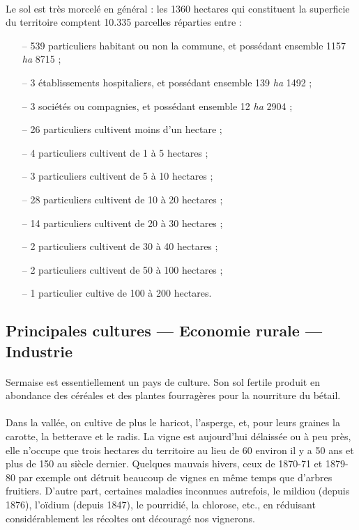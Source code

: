 \documentclass[../eBook.tex]{subfiles}
\begin{document}
    \paragraph{}Le sol est très morcelé en général : les 1360 hectares qui constituent la superficie du territoire comptent 10.335 parcelles réparties entre :
    \begin{itemize}[noitemsep]
      \setlength{\baselineskip}{16pt}
      \item[--] 539 particuliers habitant ou non la commune, et possédant ensemble 1157 \textit{ha} 8715 ;
      \item[--] 3 établissements hospitaliers, et possédant ensemble 139 \textit{ha} 1492 ;
      \item[--] 3 sociétés ou compagnies, et possédant ensemble 12 \textit{ha} 2904 ;
      \item[--] 26 particuliers cultivent moins d'un hectare ;
      \item[--] 4 particuliers cultivent de 1 à 5 hectares ;
      \item[--] 3 particuliers cultivent de 5 à 10 hectares ;
      \item[--] 28 particuliers cultivent de 10 à 20 hectares ;
      \item[--] 14 particuliers cultivent de 20 à 30 hectares ;
      \item[--] 2 particuliers cultivent de 30 à 40 hectares ;
      \item[--] 2 particuliers cultivent de 50 à 100 hectares ;
      \item[--] 1 particulier cultive de 100 à 200 hectares.
    \end{itemize}

  \subsection*{Principales cultures --- Economie rurale --- Industrie}
    \paragraph{}Sermaise est essentiellement un pays de culture. Son sol fertile produit en abondance des céréales et des plantes fourragères pour la nourriture du bétail.
    \paragraph{}Dans la vallée, on cultive de plus le haricot, l'asperge, et, pour leurs graines la carotte, la betterave et le radis. La vigne est aujourd'hui délaissée ou à peu près, elle n'occupe que trois hectares du territoire au lieu de 60 environ il y a 50 ans et plus de 150 au siècle dernier. Quelques mauvais hivers, ceux de 1870-71 et 1879-80 par exemple ont détruit beaucoup de vignes en même temps que d'arbres fruitiers. D'autre part, certaines maladies inconnues autrefois, le mildiou (depuis 1876), l'oïdium (depuis 1847), le pourridié, la chlorose, etc., en réduisant considérablement les récoltes ont découragé nos vignerons.
\end{document}
